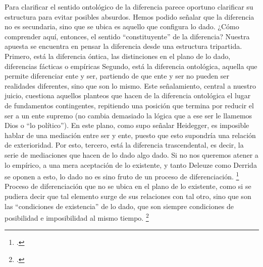 Para clarificar el sentido ontológico de la diferencia parece oportuno clarificar su estructura para evitar posibles absurdos. Hemos podido señalar que la diferencia no es secundaria, sino que se ubica es aquello que configura lo dado. ¿Cómo comprender aquí, entonces, el sentido \enquote{constituyente} de la diferencia? Nuestra apuesta se encuentra en pensar la diferencia desde una estructura tripartida. Primero, está la diferencia óntica, las distinciones en el plano de lo dado, diferencias fácticas o empíricas Segundo, está la diferencia ontológica, aquella que permite diferenciar ente y ser, partiendo de que ente y ser no pueden ser realidades diferentes, sino que son lo mismo. Este señalamiento, central a nuestro juicio, cuestiona aquellos planteos que hacen de la diferencia ontológica el lugar de fundamentos contingentes, repitiendo una posición que termina por reducir el ser a un ente supremo (no cambia demasiado la lógica que a ese ser le llamemos Dios o \enquote{lo político}). En este plano, como supo señalar Heidegger, es imposible hablar de una mediación entre ser y ente, puesto que esto supondría una relación de exterioridad. Por esto, tercero, está la diferencia trascendental, es decir, la serie de mediaciones que hacen de lo dado algo dado. Si no nos queremos atener a lo empírico, a una mera aceptación de lo existente, y tanto Deleuze como Derrida se oponen a esto, lo dado no es sino fruto de un proceso de diferenciación. \footcite[En este sentido acentuamos el carácter trascendental del empirismo de Deleuze. Al respecto señala Agamben: \enquote{(\dots) con Deleuze lo trascendental se aparta decididamente de toda idea de conciencia para presentarse como una experiencia sin conciencia ni sujeto: un empirismo trascendental}][]{@6987-AGAMBEN2008} Proceso de diferenciación que no se ubica en el plano de lo existente, como si se pudiera decir que tal elemento surge de sus relaciones con tal otro, sino que son las \enquote{condiciones de existencia} de lo dado, que son siempre condiciones de posibilidad e imposibilidad al mismo tiempo. \footcite[Por esto mismo nuestra lectura discute las tesis de Gianni Vattimo expuestas en \emph{Las aventuras de la diferencia}. De ningún modo creemos, como señala el autor, que Deleuze y Derrida, retrocedan respecto de Heidegger al eliminar su carácter historial.][]{@6988-VATTINO1999}

